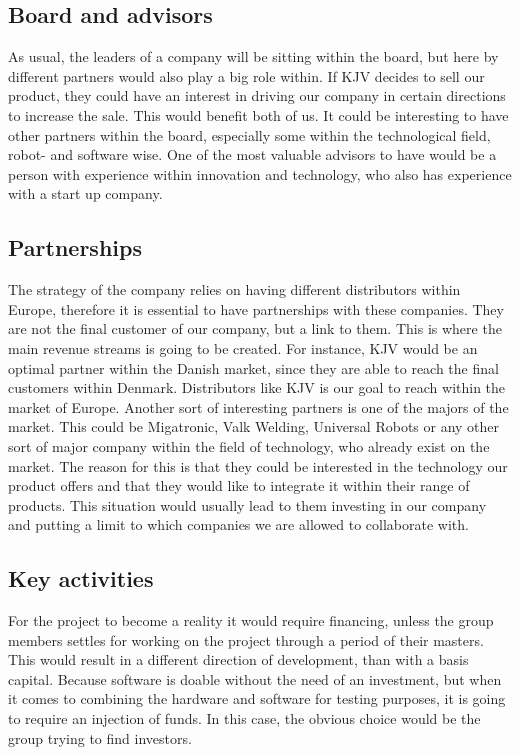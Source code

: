 
\subsection{Board and advisors}
As usual, the leaders of a company will be sitting within the board, but here by different partners would also play a big role within. If KJV decides to sell our product, they could have an interest in driving our company in certain directions to increase the sale. This would benefit both of us. 
It could be interesting to have other partners within the board, especially some within the technological field, robot- and software wise.
One of the most valuable advisors to have would be a person with experience within innovation and technology, who also has experience with a start up company. 
\subsection{Partnerships}
The strategy of the company relies on having different distributors within Europe, therefore it is essential to have partnerships with these companies. They are not the final customer of our company, but a link to them. This is where the main revenue streams is going to be created.
For instance, KJV would be an optimal partner within the Danish market, since they are able to reach the final customers within Denmark. Distributors like KJV is our goal to reach within the market of Europe.
Another sort of interesting partners is one of the majors of the market. This could be Migatronic, Valk Welding, Universal Robots or any other sort of major company within the field of technology, who already exist on the market. The reason for this is that they could be interested in the technology our product offers and that they would like to integrate it within their range of products. This situation would usually lead to them investing in our company and putting a limit to which companies we are allowed to collaborate with.

\subsection{Key activities}
For the project to become a reality it would require financing, unless the group members settles for working on the project through a period of their masters. This would result in a different direction of development, than with a basis capital. Because software is doable without the need of an investment, but when it comes to combining the hardware and software for testing purposes, it is going to require an injection of funds. In this case, the obvious choice would be the group trying to find investors.

